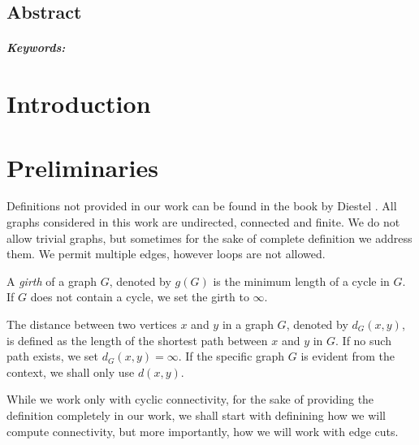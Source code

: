 \documentclass[12pt, twoside]{book}
\begin{document}
\newpage

\begin{otherlanguage}{USenglish}
    \section*{Abstract}

    \thesisabstracten{}

    \paragraph*{Keywords:} \thesiskeywordsen{}
\end{otherlanguage}

\newpage
\tableofcontents

\newpage
\listoffigures

\mainmatter{}

\chapter*{Introduction}

\chapter{Preliminaries}\label{ch:preliminaries}

Definitions not provided in our work can be found in the book  by Diestel \cite{Diestel}. All graphs considered in this work are undirected, connected and finite. We do not allow trivial graphs, but sometimes for the sake of complete definition we address them. We permit multiple edges, however loops are not allowed.

A \textit{girth} of a graph $G$, denoted by $g(G)$ is the minimum length of a cycle in $G$. If $G$ does not contain a cycle, we set the girth to $\infty$.

The distance between two vertices $x$ and $y$ in a graph $G$, denoted by $d_G(x,y)$, is defined as the length of the shortest path between $x$ and $y$ in $G$. If no such path exists, we set $d_G(x,y)=\infty$. If the specific graph $G$ is evident from the context, we shall only use $d(x,y)$.

While we work only with cyclic connectivity, for the sake of providing the definition completely in our work, we shall start with definining how we will compute connectivity, but more importantly, how we will work with edge cuts.
\end{document}
